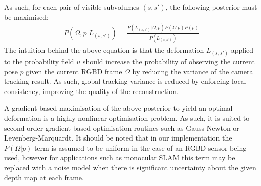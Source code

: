 As such, for each pair of visible subvolumes $(s, s')$, the following posterior must be maximised:
\begin{equation}
\begin{split}
P(\Omega, p | L_{(s, s')}) = \frac{P(L_{(s, s')} | \Omega, p) P(\Omega | p)P(p)}
{P(L_{(s, s')})}
\end{split}
\end{equation}
The intuition behind the above equation is that the deformation $L_{(s, s')}$ applied to the probability field $u$ should 
increase the probability of observing the current pose $p$ given the current RGBD frame $\Omega$ by reducing the 
variance of the camera tracking result. As such, global tracking variance is reduced by enforcing local consistency, improving the quality 
of the reconstruction.

A gradient based maximisation of the above posterior to yield an optimal deformation is a highly nonlinear optimisation problem. As such, it is suited 
to second order gradient based optimisation routines such as Gauss-Newton or Levenberg-Marquardt.
It should be noted that in our implementation the $P(\Omega | p)$ term is assumed to be uniform in the case of an 
RGBD sensor being used, however for applications such as monocular SLAM this term may be replaced with a noise model when there is 
significant uncertainty about the given depth map at each frame.

